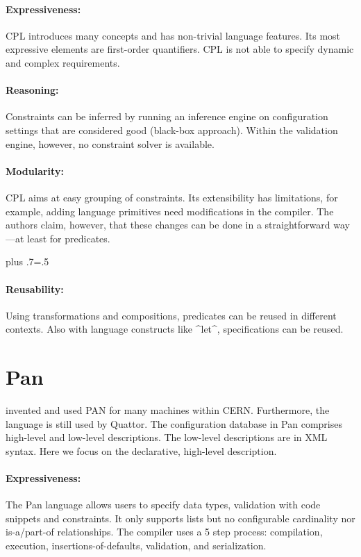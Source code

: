 \paragraph*{Expressiveness:}
CPL introduces many concepts and has non-trivial language features.
Its most expressive elements are first-order quantifiers.
CPL is not able to specify dynamic and complex requirements.

\paragraph*{Reasoning:}
Constraints can be inferred by running an inference engine on configuration settings that are considered good (black-box approach).
Within the validation engine, however, no constraint solver is available.

\paragraph*{Modularity:}
CPL aims at easy grouping of constraints.
Its extensibility has limitations, for example, adding language primitives need modifications in the compiler.
The authors claim, however, that these changes can be done in a straightforward way---at least for predicates.%
{\parfillskip=0pt plus .7\textwidth \emergencystretch=.5\textwidth \par}

\paragraph*{Reusability:}
Using transformations and compositions, predicates can be reused in different contexts.
Also with language constructs like ^let^, specifications can be reused.




\section{Pan}

\citet{cons2002pan} invented and used PAN for many machines within CERN.
Furthermore, the language is still used by Quattor.
The configuration database in Pan comprises high-level and low-level descriptions.
The low-level descriptions are in XML syntax.
Here we focus on the declarative, high-level description.

\paragraph*{Expressiveness:}
The Pan language allows users to specify data types, validation with code snippets and constraints.
It only supports lists but no configurable cardinality nor is-a/part-of relationships.
The compiler uses a 5 step process: compilation, execution, insertions-of-defaults, validation, and serialization.

